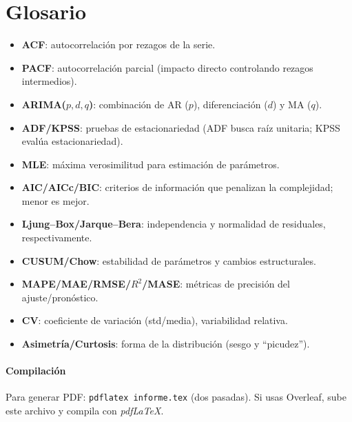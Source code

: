 \documentclass[11pt,a4paper]{article}
\begin{document}
\section*{Glosario}
\begin{itemize}
  \item \textbf{ACF}: autocorrelación por rezagos de la serie.
  \item \textbf{PACF}: autocorrelación parcial (impacto directo controlando rezagos intermedios).
  \item \textbf{ARIMA(\(p,d,q\))}: combinación de AR (\(p\)), diferenciación (\(d\)) y MA (\(q\)).
  \item \textbf{ADF/KPSS}: pruebas de estacionariedad (ADF busca raíz unitaria; KPSS evalúa estacionariedad).
  \item \textbf{MLE}: máxima verosimilitud para estimación de parámetros.
  \item \textbf{AIC/AICc/BIC}: criterios de información que penalizan la complejidad; menor es mejor.
  \item \textbf{Ljung--Box/Jarque--Bera}: independencia y normalidad de residuales, respectivamente.
  \item \textbf{CUSUM/Chow}: estabilidad de parámetros y cambios estructurales.
  \item \textbf{MAPE/MAE/RMSE/$R^2$/MASE}: métricas de precisión del ajuste/pronóstico.
  \item \textbf{CV}: coeficiente de variación (std/media), variabilidad relativa.
  \item \textbf{Asimetría/Curtosis}: forma de la distribución (sesgo y ``picudez'').
\end{itemize}

\paragraph{Compilación} Para generar PDF: \texttt{pdflatex informe.tex} (dos pasadas). Si usas Overleaf, sube este archivo y compila con \textit{pdfLaTeX}.
\end{document}
